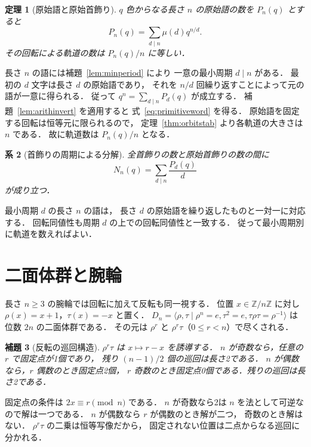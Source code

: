 \documentclass[a5paper,10pt,onecolumn]{jsarticle}
\makeatletter
\theoremstyle{mathnotetheorem}
\newtheorem{theorem}{定理}[section]
\newtheorem{lemma}[theorem]{補題}
\newtheorem{corollary}[theorem]{系}
\renewcommand{\proofname}{証明}
\renewenvironment{proof}[1][\proofname]{%
  \par\pushQED{\qed}\normalfont\topsep4\p@\@plus2\p@\relax
  \trivlist\item[\hskip\labelsep\bfseries #1]\ignorespaces
}{\popQED\endtrivlist\@endpefalse}
\makeatother
\begin{document}
\begin{theorem}[原始語と原始首飾り]\label{thm:primitive}
$q$ 色からなる長さ $n$ の原始語の数を $P_n(q)$ とすると
\begin{equation}\label{eq:primitiveword}
 P_n(q)=\sum_{d\mid n}\mu(d)q^{n/d}.
\end{equation}
その回転による軌道の数は $P_n(q)/n$ に等しい．
\end{theorem}
\begin{proof}
長さ $n$ の語には補題~\ref{lem:minperiod} により
一意の最小周期 $d\mid n$ がある．
最初の $d$ 文字は長さ $d$ の原始語であり，
それを $n/d$ 回繰り返すことによって元の語が一意に得られる．
従って
$ q^n=\sum_{d\mid n}P_d(q)$ が成立する．
補題~\ref{lem:arithinvert} を適用すると
式~\eqref{eq:primitiveword} を得る．
原始語を固定する回転は恒等元に限られるので，
定理~\ref{thm:orbitstab} より各軌道の大きさは $n$ である．
故に軌道数は $P_n(q)/n$ となる．
\end{proof}

\begin{corollary}[首飾りの周期による分解]
全首飾りの数と原始首飾りの数の間に
\[
 N_n(q)=\sum_{d\mid n}\frac{P_d(q)}d
\]
が成り立つ．
\end{corollary}
\begin{proof}
最小周期 $d$ の長さ $n$ の語は，
長さ $d$ の原始語を繰り返したものと一対一に対応する．
回転同値性も周期 $d$ の上での回転同値性と一致する．
従って最小周期別に軌道を数えればよい．
\end{proof}

\section{二面体群と腕輪}
長さ $n\ge3$ の腕輪では回転に加えて反転も同一視する．
位置 $x\in\mathbb Z/n\mathbb Z$ に対し
$\rho(x)=x+1$，$\tau(x)=-x$ と置く．
$D_n=\langle\rho,\tau\mid \rho^n=e,\tau^2=e,
\tau\rho\tau=\rho^{-1}\rangle$ は位数 $2n$ の二面体群である．
その元は $\rho^r$ と $\rho^r\tau$（$0\le r<n$）で尽くされる．

\begin{lemma}[反転の巡回構造]\label{lem:reflections}
$\rho^r\tau$ は $x\mapsto r-x$ を誘導する．
$n$ が奇数なら，任意の $r$ で固定点が1個であり，
残り $(n-1)/2$ 個の巡回は長さ2である．
$n$ が偶数なら，$r$ 偶数のとき固定点2個，
$r$ 奇数のとき固定点0個である．残りの巡回は長さ2である．
\end{lemma}
\begin{proof}
固定点の条件は $2x\equiv r\pmod n$ である．
$n$ が奇数なら2は $n$ を法として可逆なので解は一つである．
$n$ が偶数なら $r$ が偶数のとき解が二つ，
奇数のとき解はない．
$\rho^r\tau$ の二乗は恒等写像だから，
固定されない位置は二点からなる巡回に分かれる．
\end{proof}
\end{document}
